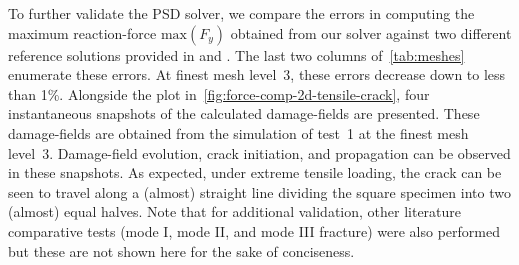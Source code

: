 \documentclass{report}
\begin{document}
To further validate  the PSD solver, we compare the errors in computing the maximum reaction-force $\text{max}(F_y)$ obtained from our solver against two different reference solutions provided in \cite{Ambati2014} and \cite{amor2009regularized}.
The last two columns of~\cref{tab:meshes} enumerate these errors. At finest mesh level~3, these errors decrease down to less than 1\si{\percent}. 
Alongside the plot in~\cref{fig:force-comp-2d-tensile-crack}, four instantaneous snapshots of the calculated damage-fields are presented. These damage-fields are obtained from the  simulation of test~1 at the finest mesh level~3. Damage-field evolution, crack initiation, and propagation can be observed in these snapshots. As expected, under extreme tensile loading, the crack can be seen to travel along  a (almost) straight line dividing the square specimen into two (almost) equal halves. Note that for additional validation, other literature comparative tests (mode I, mode II, and mode III fracture) were also performed but these are not shown here for the sake of conciseness.                        
%
\end{document}
